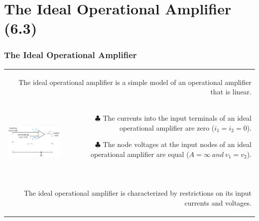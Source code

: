 \documentclass[aspectratio=169]{beamer}
\begin{document}
\section{The Ideal Operational Amplifier (6.3)}
\begin{frame}[fragile]
\frametitle{The Ideal Operational Amplifier}
\begin{tabular}{r}
	\begin{columns}	\column{1\textwidth}
	The ideal operational amplifier is a simple
model of an operational amplifier that is linear. 

	\end{columns} \\
	\begin{columns}
		\begin{column}{.3\textwidth}  %
			\includegraphics[height=3cm]{figura04.png}

		\end{column}
		\begin{column}{.6\textwidth}  %
		
		  \begin{itemize}
		    \item[$\clubsuit$]{The currents into the input terminals of an ideal
operational amplifier are zero ($i_{1}=i_{2}=0$).\newline}
		    \item[$\clubsuit$]{The node voltages at the input nodes of an ideal operational amplifier are equal ($A=\infty \ and \ v_{1}=v_{2}$).\newline}	
		  		
		  \end{itemize}
		
			 
		\end{column}
	\end{columns} \\

	\begin{columns}	\column{1\textwidth}
	{\newline The ideal operational amplifier is characterized by restrictions on its input currents and voltages.}
	\end{columns}





\end{tabular}
\end{frame}
\end{document}
